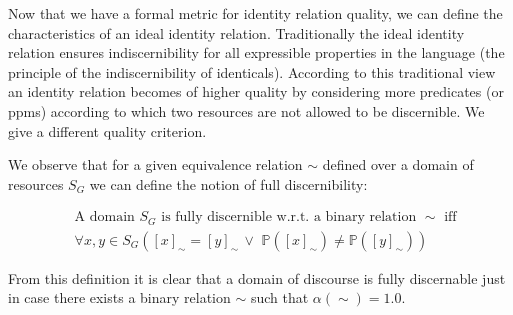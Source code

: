 Now that we have a formal metric for identity relation quality,
  we can define the characteristics of an ideal identity relation.
Traditionally the ideal identity relation ensures indiscernibility
  for all expressible properties in the language
  (the principle of the indiscernibility of identicals).
According to this traditional view an identity relation becomes of
  higher quality by considering more predicates (or ppms)
  according to which two resources are not allowed to be discernible.
We give a different quality criterion.

We observe that for a given equivalence relation $\sim$
  defined over a domain of resources $S_G$ we can define the notion of
  full discernibility:

\small
\begin{definition}
\label{def:fully_discernible}
\begin{align}
& \text{A domain $S_G$ is fully discernible w.r.t. a binary relation $\sim$ iff}
\nonumber
\\
 & \forall x,y \in S_G (
    [x]_{\sim}=[y]_{\sim}
  \,\lor\,\,
    \mathbb{P}([x]_{\sim}) \neq \mathbb{P}([y]_{\sim})
  )
\end{align}
\end{definition}
\normalsize

\noindent From this definition it is clear that a domain of discourse
  is fully discernable just in case there exists a binary relation $\sim$
  such that \mbox{$\alpha(\sim) = 1.0$}.
